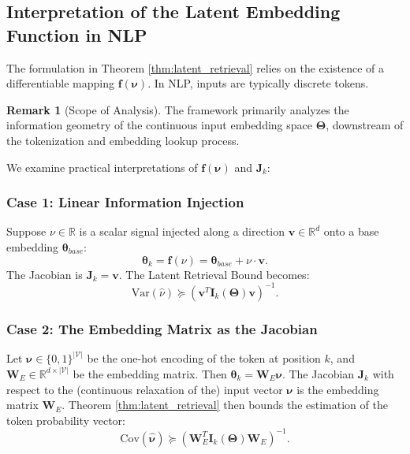 \documentclass{article}
\theoremstyle{definition}
\newtheorem{remark}[theorem]{Remark}
\begin{document}
\subsection{Interpretation of the Latent Embedding Function in NLP}
The formulation in Theorem \ref{thm:latent_retrieval} relies on the existence of a differentiable mapping $\mathbf{f}(\boldsymbol{\nu})$. In NLP, inputs are typically discrete tokens.

\begin{remark}[Scope of Analysis]
The framework primarily analyzes the information geometry of the continuous input embedding space $\mathbf{\Theta}$, downstream of the tokenization and embedding lookup process.
\end{remark}

We examine practical interpretations of $\mathbf{f}(\boldsymbol{\nu})$ and $\mathbf{J}_k$:

\subsubsection{Case 1: Linear Information Injection}
Suppose $\nu \in \mathbb{R}$ is a scalar signal injected along a direction $\mathbf{v} \in \mathbb{R}^d$ onto a base embedding $\boldsymbol{\theta}_{base}$:
\begin{equation}
    \boldsymbol{\theta}_k = \mathbf{f}(\nu) = \boldsymbol{\theta}_{base} + \nu \cdot \mathbf{v}.
\end{equation}
The Jacobian is $\mathbf{J}_k = \mathbf{v}$. The Latent Retrieval Bound becomes:
\begin{equation}
    \text{Var}(\hat{\nu}) \succeq (\mathbf{v}^T \mathbf{I}_k(\mathbf{\Theta}) \mathbf{v})^{-1}.
\end{equation}

\subsubsection{Case 2: The Embedding Matrix as the Jacobian}
Let $\boldsymbol{\nu} \in \{0,1\}^{|\mathcal{V}|}$ be the one-hot encoding of the token at position $k$, and $\mathbf{W}_E \in \mathbb{R}^{d \times |\mathcal{V}|}$ be the embedding matrix. Then $\boldsymbol{\theta}_k = \mathbf{W}_E \boldsymbol{\nu}$. The Jacobian $\mathbf{J}_k$ with respect to the (continuous relaxation of the) input vector $\boldsymbol{\nu}$ is the embedding matrix $\mathbf{W}_E$. Theorem \ref{thm:latent_retrieval} then bounds the estimation of the token probability vector:
\begin{equation}
    \text{Cov}(\hat{\boldsymbol{\nu}}) \succeq (\mathbf{W}_E^T \mathbf{I}_k(\mathbf{\Theta}) \mathbf{W}_E)^{-1}.
\end{equation}
\end{document}
